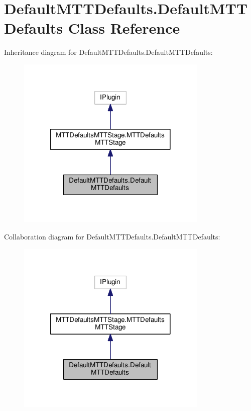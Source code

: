 \hypertarget{classDefaultMTTDefaults_1_1DefaultMTTDefaults}{\section{Default\-M\-T\-T\-Defaults.\-Default\-M\-T\-T\-Defaults Class Reference}
\label{classDefaultMTTDefaults_1_1DefaultMTTDefaults}
}


Inheritance diagram for Default\-M\-T\-T\-Defaults.\-Default\-M\-T\-T\-Defaults\-:
\nopagebreak
\begin{figure}[H]
\begin{center}
\leavevmode
\includegraphics[width=258pt]{classDefaultMTTDefaults_1_1DefaultMTTDefaults__inherit__graph}
\end{center}
\end{figure}


Collaboration diagram for Default\-M\-T\-T\-Defaults.\-Default\-M\-T\-T\-Defaults\-:
\nopagebreak
\begin{figure}[H]
\begin{center}
\leavevmode
\includegraphics[width=258pt]{classDefaultMTTDefaults_1_1DefaultMTTDefaults__coll__graph}
\end{center}
\end{figure}
